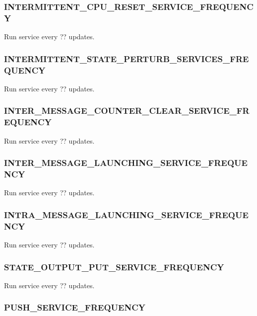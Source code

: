 \subsubsection{INTERMITTENT\_CPU\_RESET\_SERVICE\_FREQUENCY}


Run service every ?? updates.

\subsubsection{INTERMITTENT\_STATE\_PERTURB\_SERVICES\_FREQUENCY}


Run service every ?? updates.

\subsubsection{INTER\_MESSAGE\_COUNTER\_CLEAR\_SERVICE\_FREQUENCY}


Run service every ?? updates.

\subsubsection{INTER\_MESSAGE\_LAUNCHING\_SERVICE\_FREQUENCY}


Run service every ?? updates.

\subsubsection{INTRA\_MESSAGE\_LAUNCHING\_SERVICE\_FREQUENCY}


Run service every ?? updates.

\subsubsection{STATE\_OUTPUT\_PUT\_SERVICE\_FREQUENCY}


Run service every ?? updates.

\subsubsection{PUSH\_SERVICE\_FREQUENCY}

